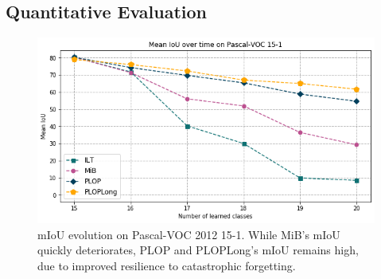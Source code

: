 \subsection{Quantitative Evaluation}
\label{sec:quantitative}

\begin{figure}
    \includegraphics[width=0.9\linewidth]{images/seg/voc_15-1.png}
    \vspace*{-0.3cm}
    \caption{mIoU evolution on Pascal-VOC 2012 15-1. While MiB's mIoU quickly deteriorates, PLOP and PLOPLong's mIoU remains high, due to improved resilience to catastrophic forgetting.}
    \label{fig:plot_voc_15-1}
\end{figure}


